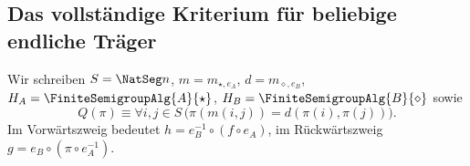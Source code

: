 \subsection{Das vollständige Kriterium für beliebige endliche Träger}
Wir schreiben \(S=\NatSeg n\), \(m=m_{\star,e_A}\),
\(d=m_{\diamond,e_B}\), \(H_A=\FiniteSemigroupAlg{A}{\star}\),
\(H_B=\FiniteSemigroupAlg{B}{\diamond}\) sowie
\[
 Q(\pi)\equiv\forall i,j\in S\,
   \bigl(\pi(m(i,j))=d(\pi(i),\pi(j))\bigr).
\]
Im Vorwärtszweig bedeutet \(h=e_B^{-1}\circ(f\circ e_A)\), im
Rückwärtszweig \(g=e_B\circ(\pi\circ e_A^{-1})\).
